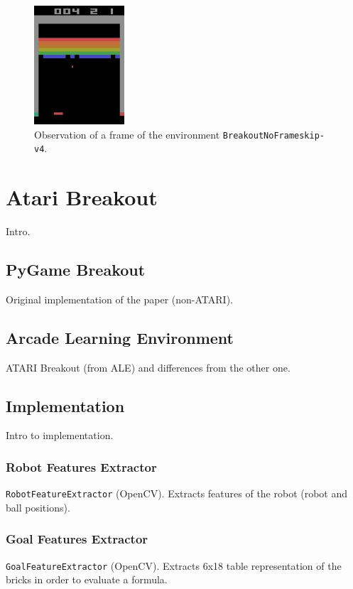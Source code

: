 \documentclass[a4paper]{article}
\begin{document}
\begin{figure}
    \centering
    \includegraphics[width=0.3\textwidth]{images/gym-breakout-image-example.jpg}
    \caption{Observation of a frame of the environment
        \texttt{BreakoutNoFrameskip-v4}.}
    \label{fig:gym-breakout-image-example}
\end{figure}

\clearpage
\section{Atari Breakout}
Intro.

\subsection{PyGame Breakout}
Original implementation of the paper (non-ATARI).

\subsection{Arcade Learning Environment}
ATARI Breakout (from ALE) and differences from the other one.

\subsection{Implementation}
Intro to implementation.

\subsubsection{Robot Features Extractor}
\texttt{RobotFeatureExtractor} (OpenCV). Extracts features of the robot (robot
and ball positions).


\subsubsection{Goal Features Extractor}
\texttt{GoalFeatureExtractor} (OpenCV). Extracts 6x18 table representation
of the bricks in order to evaluate a formula.

\end{document}
